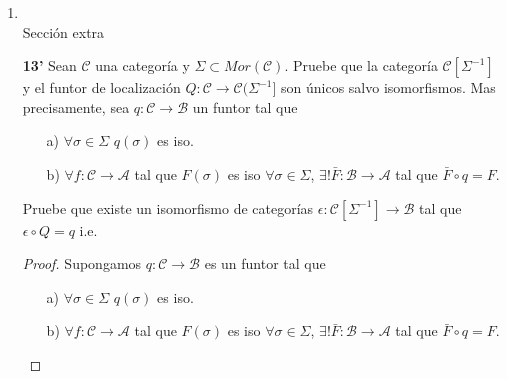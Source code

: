 \documentclass{article}
\begin{document}
\begin{enumerate}
\begin{proof}
\begin{enumerate}
Adem\'as para cualquier $\theta : \xymatrix{X\ar[r]^u & Y\ar[r]^v & Z\ar[r]^w & TX } \in \mathcal{T}(\mathscr{C}_{1},T_{1})$ se cumple que:

\begin{align*}
\bar{F}(1_{\theta}) =& \bar{F}(1_{X},1_{Y},1_{Z})\\
=& ( F(1_{X}),F(1_{Y}),F(1_{Z}) )\\
=& (1_{FX},1_{FY},1_{FZ})\\
=& 1_{\bar{F}(\theta)}.
\end{align*}

Se puede concluir que $\bar{F}:\mathcal{T}(\mathscr{C}_{1},T_{1})\to \mathcal{T}(\mathscr{C}_{2},T_{2})$ es un funtor.

\end{enumerate}
\end{proof}

\item 
\,\\

Sección extra

\textbf{13'} Sean $\mathscr{C}$ una categoría y $\Sigma\subset Mor(\mathscr{C})$. Pruebe que la categoría $\mathscr{C}[\Sigma^{-1}]$ y el 
funtor de localización $Q:\mathscr{C}\rightarrow \mathscr{C}(\Sigma^{-1}]$ son únicos salvo isomorfismos. Mas precisamente, sea $q:\mathscr{C}
\rightarrow \mathscr{B}$ un funtor tal que 
\begin{itemize}
\item[a)] $\forall \sigma\in \Sigma$ \quad $q(\sigma)$ es iso.
\item[b)] $\forall f:\mathscr{C}\to \mathscr{A}$ tal que $F(\sigma)$ es iso $\forall \sigma\in \Sigma$, $\exists ! \bar{F}:\mathscr{B}\to\mathscr{A}$
tal que $\bar{F}\circ q=F$.\\
\end{itemize}
Pruebe que existe un isomorfismo de categorías $\epsilon:\mathscr{C}[\Sigma^{-1}]\to \mathscr{B}$ tal que \\$\epsilon\circ Q=q$ \quad i.e. \\
\centerline{
}
\begin{proof}
Supongamos $q:\mathscr{C}\to \mathscr{B}$ es un funtor tal que 
\begin{itemize}
\item[a)] $\forall \sigma\in \Sigma$ \quad $q(\sigma)$ es iso.
\item[b)] $\forall f:\mathscr{C}\to \mathscr{A}$ tal que $F(\sigma)$ es iso $\forall \sigma\in \Sigma$, $\exists ! \bar{F}:\mathscr{B}\to\mathscr{A}$
tal que $\bar{F}\circ q=F$.\\
\end{itemize}


\end{proof}
\end{enumerate}
\end{document}
